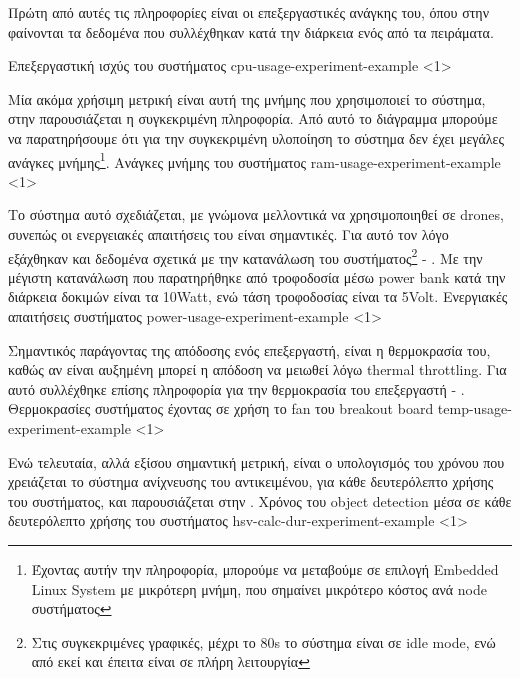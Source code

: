 Πρώτη από αυτές τις πληροφορίες είναι οι επεξεργαστικές ανάγκης του, όπου στην 
φαίνονται τα δεδομένα που συλλέχθηκαν κατά την διάρκεια ενός από τα πειράματα. 

{Επεξεργαστική ισχύς του συστήματος}%
{cpu-usage-experiment-example}%
<1>

Μία ακόμα χρήσιμη μετρική είναι αυτή της μνήμης που χρησιμοποιεί το σύστημα, στην 
παρουσιάζεται η συγκεκριμένη πληροφορία. Από αυτό το διάγραμμα μπορούμε να παρατηρήσουμε ότι για την συγκεκριμένη υλοποίηση το σύστημα δεν έχει μεγάλες ανάγκες μνήμης\footnote{Έχοντας αυτήν την πληροφορία, μπορούμε να μεταβούμε σε επιλογή Embedded Linux System με μικρότερη μνήμη, που σημαίνει μικρότερο κόστος ανά node συστήματος}.
{Ανάγκες μνήμης του συστήματος}%
{ram-usage-experiment-example}%
<1>

Το σύστημα αυτό σχεδιάζεται, με γνώμονα μελλοντικά να χρησιμοποιηθεί σε drones, συνεπώς οι ενεργειακές απαιτήσεις του είναι σημαντικές. Για αυτό τον λόγο ε\-ξά\-χθη\-καν και δεδομένα σχετικά με την κατανάλωση του συστήματος\footnote{Στις συγκεκριμένες γραφικές, μέχρι το 80s το σύστημα είναι σε idle mode, ενώ από εκεί και έπειτα είναι σε πλήρη λειτουργία} - . Με την μέγιστη κατανάλωση που παρατηρήθηκε από τροφοδοσία μέσω power bank κατά την διάρκεια δοκιμών είναι τα 10Watt, ενώ τάση τροφοδοσίας είναι τα 5Volt.
{Ενεργιακές απαιτήσεις συστήματος}%
{power-usage-experiment-example}%
<1>

Σημαντικός παράγοντας της απόδοσης ενός επεξεργαστή, είναι η θερμοκρασία του, καθώς αν είναι αυξημένη μπορεί η απόδοση να μειωθεί λόγω thermal throttling. Για αυτό συλλέχθηκε επίσης πληροφορία για την θερμοκρασία του επεξεργαστή - . 
{Θερμοκρασίες συστήματος έχοντας σε χρήση το fan του breakout board}%
{temp-usage-experiment-example}%
<1>

Ενώ τελευταία, αλλά εξίσου σημαντική μετρική, είναι ο υπολογισμός του χρόνου που χρειάζεται το σύστημα ανίχνευσης του αντικειμένου, για κάθε δευτερόλεπτο χρήσης του συστήματος, και παρουσιάζεται στην .
{Χρόνος του object detection μέσα σε κάθε δευτερόλεπτο χρήσης του συστήματος}%
{hsv-calc-dur-experiment-example}%
<1>

